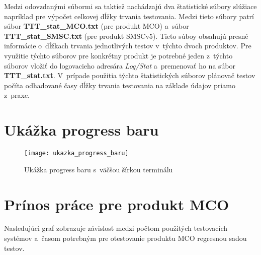 Medzi odovzdanými súbormi sa taktiež nachádzajú dva štatistické súbory 
slúžiace napríklad pre výpočet celkovej dĺžky trvania testovania. 
Medzi tieto súbory patrí súbor \textbf{TTT\_stat\_MCO.txt} (pre produkt MCO) 
a~súbor \textbf{TTT\_stat\_SMSC.txt} (pre produkt SMSCv5).
Tieto súboy obsahujú presné informácie o~dĺžkach trvania jednotlivých 
testov v~týchto dvoch produktov. 
Pre využitie týchto súborov pre konkrétny produkt je potrebné jeden 
z~týchto súborov vložiť do logovacieho adresára \textit{Log/Stat} 
a~premenovať ho na súbor \textbf{TTT\_stat.txt}.
V~prípade použitia týchto štatistických súborov plánovač testov počíta
odhadované časy dĺžky trvania testovania na základe údajov priamo z~praxe.



%
%
\chapter{Ukážka progress baru}
\label{priloha:ukazka_progress_baru}
\begin{figure}[h]
  \begin{center}
    \texttt{[image: ukazka\_progress\_baru]} 
    \caption{Ukážka progress baru s~väčšou šírkou terminálu}
  \end{center}
\end{figure}



%
%
\chapter{Prínos práce pre produkt MCO}
\label{priloha:graf_mco}
Nasledujúci graf zobrazuje závislosť medzi počtom použitých testovacích
systémov a~časom potrebným pre otestovanie produktu MCO regresnou 
sadou testov.

\begin{figure}[h!]
\end{figure}



